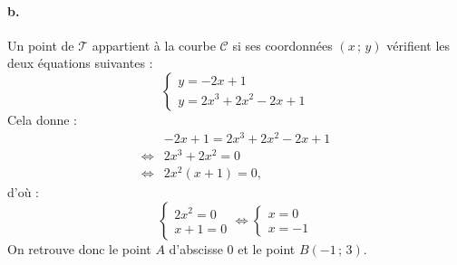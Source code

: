 \documentclass[10pt]{article}
\begin{document}
\paragraph{b.} Un point de \(\mathcal{T}\) appartient à la courbe \(\mathcal{C}\) si ses coordonnées \((x\,;\,y)\) vérifient les deux équations suivantes :
\[
\begin{cases}
y = -2x + 1 \\
y = 2x^3 + 2x^2 - 2x + 1
\end{cases}
\]
Cela donne :
\begin{align*}
&-2x + 1 = 2x^3 + 2x^2 - 2x + 1 \\
\iff &2x^3 + 2x^2 = 0 \\
\iff &2x^2(x + 1) = 0,
\end{align*}
d'où :
\[
\left\{
\begin{array}{l}
2x^2 = 0 \\
x + 1 = 0
\end{array}
\right.
\iff
\left\{
\begin{array}{l}
x = 0 \\
x = -1
\end{array}
\right.
\]
On retrouve donc le point \(A\) d'abscisse \(0\) et le point \(B(-1\,;\,3)\).
\end{document}
